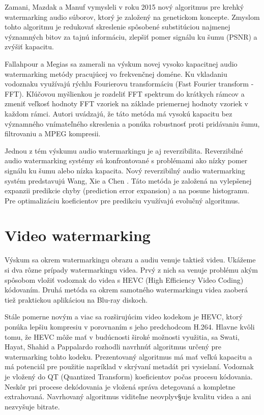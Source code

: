 Zamani, Mazdak a Manuf \cite{Zamani2015} vymysleli v roku 2015 nový algoritmus pre krehký watermarking audio súborov, ktorý je založený na genetickom koncepte. Zmyslom tohto algoritmu je redukovať skreslenie spôsobené substitúciou najmenej významných bitov za tajnú informáciu, zlepšiť pomer signálu ku šumu (PSNR) a zvýšiť kapacitu.

Fallahpour a Megias \cite{Fallahpour} sa zamerali na výskum novej vysoko kapacitnej audio watermarking metódy pracujúcej vo frekvenčnej doméne. Ku vkladaniu vodoznaku využívajú rýchlu Fourierovu transformáciu (Fast Fourier transform - FFT). Kľúčovou myšlienkou je rozdeliť FFT spektrum do krátkych rámcov a zmeniť veľkosť hodnoty FFT vzoriek na základe priemernej hodnoty vzoriek v každom rámci. Autori uvádzajú, že táto metóda má vysokú kapacitu bez významného vnímateľného skreslenia a ponúka robustnosť proti pridávaniu šumu, filtrovaniu a MPEG kompresii.

Jednou z tém výskumu audio watermarkingu je aj reverzibilita. Reverzibilné audio watermarking systémy sú konfrontované s problémami ako nízky pomer signálu ku šumu alebo nízka kapacita. Nový reverzibilný audio watermarking systém predstavujú Wang, Xie a Chen \cite{Wang2014}. Táto metóda je založená na vylepšenej expanzii predikcie chyby (prediction error expansion) a na posune histogramu. Pre optimalizáciu koeficientov pre predikciu využívajú evolučný algoritmus.

\section{Video watermarking}
Výskum sa okrem watermarkingu obrazu a audiu venuje taktiež videu. Ukážeme si dva rôzne prípady watermarkingu videa. Prvý z nich sa venuje problému akým spôsobom vložiť vodoznak do videa s HEVC (High Efficiency Video Coding) kódovaním. Druhá metóda sa okrem samotného watermarkingu videa zaoberá tiež praktickou aplikáciou na Blu-ray diskoch.

Stále pomerne novým a viac sa rozširujúcim video kodekom je HEVC, ktorý ponúka lepšiu kompresiu v porovnaním s jeho predchodcom H.264. Hlavne kvôli tomu, že HEVC môže mať v budúcnosti široké možnosti využitia, sa Swati, Hayat, Shahid a Pappalardo \cite{Swati2014} rozhodli navrhnúť algoritmus určený pre watermarking tohto kodeku. Prezentovaný algoritmus má mať veľkú kapacitu a má potenciál pre použitie napríklad v skrývaní metadát pri vysielaní. Vodoznak je vložený do QT (Quantized Transform) koeficientov počas procesu kódovania. Neskôr pri procese dekódovania je vložená správa detegovaná a kompletne extrahovaná. Navrhovaný algoritmus viditeľne neovplyv§uje kvalitu videa a ani nezvyšuje bitrate.

